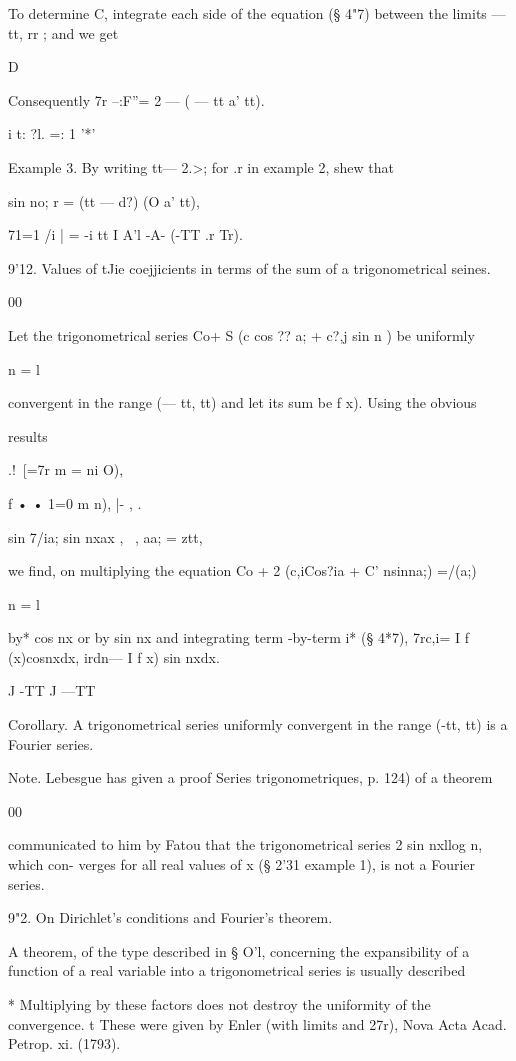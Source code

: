 To determine C, integrate each side of the equation (§ 4"7) between
the limits — tt, rr ; and we get

D

Consequently 7r --:F''= 2 — ( — tt a' tt).

i t: ?l. =: 1 '*'

Example 3. By writing tt— 2.>; for .r in example 2, shew that

  sin no; r = (tt — d?) (O a' tt),

71=1 /i | = -i tt I A'l -A- (-TT .r Tr).

9'12. Values of tJie coejjicients in terms of the sum of a
trigonometrical seines.

00

Let the trigonometrical series Co+ S (c cos ?? a; + c?,j sin n ) be
uniformly

n = l

convergent in the range (— tt, tt) and let its sum be f x). Using the
obvious

results

.!\ [=7r m = ni O),

f • • 1=0 m n), |- , .

sin 7/ia; sin nxax , \ , aa; = ztt,

we find, on multiplying the equation Co + 2 (c,iCos?ia + C' nsinna;)
=/(a;)

n = l

by* cos nx or by sin nx and integrating term -by-term i* (§ 4*7),
7rc,i= I f (x)cosnxdx, irdn— I f x) sin nxdx.

J -TT J —TT

Corollary. A trigonometrical series uniformly convergent in the range
(-tt, tt) is a Fourier series.

Note. Lebesgue has given a proof Series trigonometriques, p. 124) of a
theorem

00

communicated to him by Fatou that the trigonometrical series 2 sin
nxllog n, which con- verges for all real values of x (§ 2'31 example
1), is not a Fourier series.

9"2. On Dirichlet's conditions and Fourier's theorem.

A theorem, of the type described in § O'l, concerning the
expansibility of a function of a real variable into a trigonometrical
series is usually described

* Multiplying by these factors does not destroy the uniformity of the
convergence. t These were given by Enler (with limits and 27r), Nova
Acta Acad. Petrop. xi. (1793).

